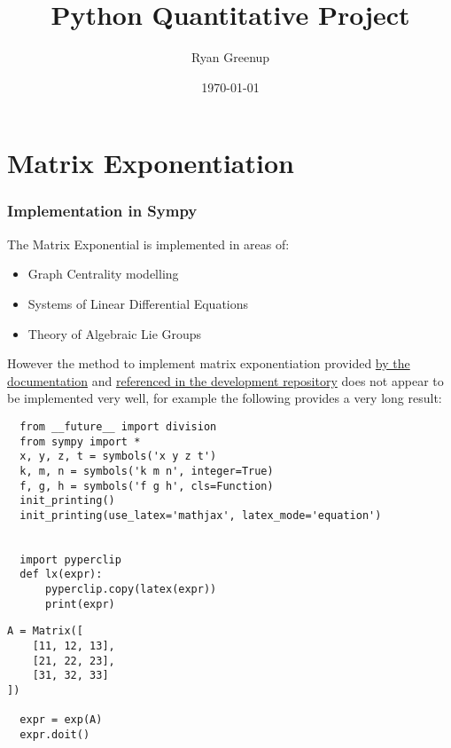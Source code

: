 \documentclass[11pt]{article}
\author{Ryan Greenup}
\date{\today}
\title{Python Quantitative Project}
\begin{document}
\maketitle
\tableofcontents

\section{Matrix Exponentiation}
\label{sec:org42085ff}
\subsubsection{Implementation in Sympy}
\label{sec:org36a994b}
The Matrix Exponential is implemented in areas of:

\begin{itemize}
\item Graph Centrality modelling \cite{parkPowerWalkRevisiting2013}
\item Systems of Linear Differential Equations \cite[Ch. 8.4]{Zil2009}
\item Theory of Algebraic Lie Groups \cite[Ch. 2]{hallLieGroupsLie2015}
\end{itemize}

However the method to implement matrix exponentiation provided \href{https://docs.sympy.org/latest/tutorial/matrices.html}{by the documentation} \cite{MatricesSymPyDocumentation2020} and \href{https://github.com/sympy/sympy/issues/6218}{referenced in the development repository} \cite{MatrixExponentialIssue2019} does not appear to be implemented very well, for example the following provides a very long result:

\begin{verbatim}
  from __future__ import division
  from sympy import *
  x, y, z, t = symbols('x y z t')
  k, m, n = symbols('k m n', integer=True)
  f, g, h = symbols('f g h', cls=Function)
  init_printing()
  init_printing(use_latex='mathjax', latex_mode='equation')


  import pyperclip
  def lx(expr):
      pyperclip.copy(latex(expr))
      print(expr)
\end{verbatim}

\begin{verbatim}
A = Matrix([
    [11, 12, 13],
    [21, 22, 23],
    [31, 32, 33]
])

  expr = exp(A)
  expr.doit()
\end{verbatim}
\end{document}
